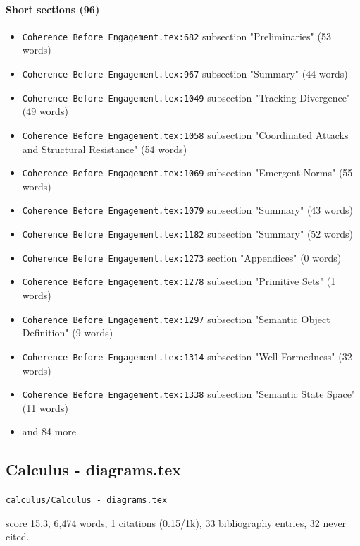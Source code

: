 \documentclass[11pt]{article}
\newcommand{\loc}[1]{{\small\color{muted}\texttt{#1}}}
\begin{document}
\paragraph{Short sections (96)}
\begin{itemize}
\item \loc{Coherence Before Engagement.tex:682} subsection "Preliminaries" (53 words)
\item \loc{Coherence Before Engagement.tex:967} subsection "Summary" (44 words)
\item \loc{Coherence Before Engagement.tex:1049} subsection "Tracking Divergence" (49 words)
\item \loc{Coherence Before Engagement.tex:1058} subsection "Coordinated Attacks and Structural Resistance" (54 words)
\item \loc{Coherence Before Engagement.tex:1069} subsection "Emergent Norms" (55 words)
\item \loc{Coherence Before Engagement.tex:1079} subsection "Summary" (43 words)
\item \loc{Coherence Before Engagement.tex:1182} subsection "Summary" (52 words)
\item \loc{Coherence Before Engagement.tex:1273} section "Appendices" (0 words)
\item \loc{Coherence Before Engagement.tex:1278} subsection "Primitive Sets" (1 words)
\item \loc{Coherence Before Engagement.tex:1297} subsection "Semantic Object Definition" (9 words)
\item \loc{Coherence Before Engagement.tex:1314} subsection "Well-Formedness" (32 words)
\item \loc{Coherence Before Engagement.tex:1338} subsection "Semantic State Space" (11 words)
\item[] {\color{muted}\small and 84 more}
\end{itemize}
\subsection{Calculus - diagrams.tex}
\loc{calculus/\allowbreak{}Calculus - diagrams.tex}\par
score 15.3, 6,474 words, 1 citations (0.15/1k), 33 bibliography entries, 32 never cited.
\end{document}
